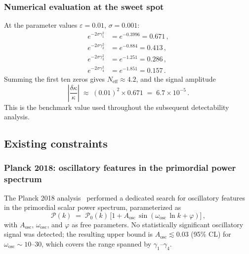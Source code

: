 \documentclass[12pt,a4paper]{article}
\begin{document}
\subsubsection{Numerical evaluation at the sweet spot}

At the parameter values $\varepsilon = 0.01$,
$\sigma = 0.001$:
\begin{align}
  e^{-2\sigma\gamma_1^2}
  &= e^{-0.3996} = 0.671\,,
  \label{eq:damp1}\\[4pt]
  e^{-2\sigma\gamma_2^2}
  &= e^{-0.884} = 0.413\,,
  \label{eq:damp2}\\[4pt]
  e^{-2\sigma\gamma_3^2}
  &= e^{-1.251} = 0.286\,,
  \label{eq:damp3}\\[4pt]
  e^{-2\sigma\gamma_4^2}
  &= e^{-1.851} = 0.157\,.
  \label{eq:damp4}
\end{align}
Summing the first ten zeros gives
$N_{\mathrm{eff}} \approx 4.2$, and the signal amplitude
\begin{equation}\label{eq:signal-sweetspot}
  \left|\frac{\delta\kappa}{\kappa}\right|
  \;\approx\;
  (0.01)^2 \times 0.671
  \;=\;
  6.7\times 10^{-5}\,.
\end{equation}
This is the benchmark value used throughout the
subsequent detectability analysis.


\subsection{Existing constraints}
\label{sec:constraints}

\subsubsection{Planck 2018: oscillatory features in the
  primordial power spectrum}

The Planck 2018 analysis~\cite{Planck2018X} performed
a dedicated search for oscillatory features in the
primordial scalar power spectrum, parameterized as
\begin{equation}\label{eq:planck-osc}
  \mathcal{P}(k)
  \;=\;
  \mathcal{P}_0(k)\,
  \bigl[1 + A_{\mathrm{osc}}\,
  \sin(\omega_{\mathrm{osc}}\,\ln k + \varphi)\bigr]\,,
\end{equation}
with $A_{\mathrm{osc}}$, $\omega_{\mathrm{osc}}$, and
$\varphi$ as free parameters.
No statistically significant oscillatory signal was
detected; the resulting upper bound is
$A_{\mathrm{osc}} \lesssim 0.03$ (95\% CL) for
$\omega_{\mathrm{osc}}\sim 10$--$30$, which covers
the range spanned by $\gamma_1$--$\gamma_4$.
\end{document}
